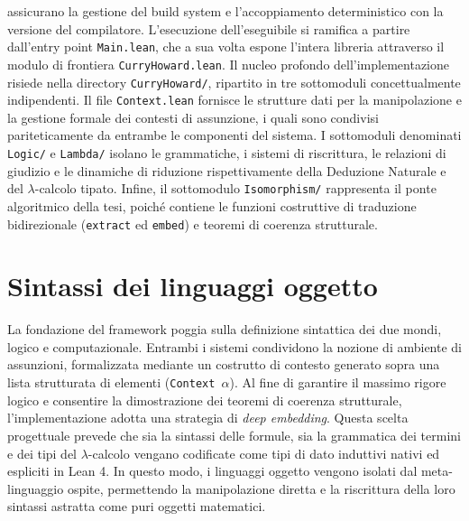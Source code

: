 assicurano la gestione del build system e l'accoppiamento deterministico con la versione del compilatore. L'esecuzione dell'eseguibile si ramifica a partire dall'entry 
point \texttt{Main.lean}, che a sua volta espone l'intera libreria attraverso il modulo di frontiera \texttt{CurryHoward.lean}. Il nucleo profondo dell'implementazione 
risiede nella directory \texttt{CurryHoward/}, ripartito in tre sottomoduli concettualmente indipendenti. Il file \texttt{Context.lean} fornisce le strutture dati per 
la manipolazione e la gestione formale dei contesti di assunzione, i quali sono condivisi pariteticamente da entrambe le componenti del sistema. I sottomoduli denominati 
\texttt{Logic/} e \texttt{Lambda/} isolano le grammatiche, i sistemi di riscrittura, le relazioni di giudizio e le dinamiche di riduzione rispettivamente della Deduzione 
Naturale e del $\lambda$-calcolo tipato. Infine, il sottomodulo \texttt{Isomorphism/} rappresenta il ponte algoritmico della tesi, poiché contiene le funzioni costruttive 
di traduzione bidirezionale (\texttt{extract} ed \texttt{embed}) e teoremi di coerenza strutturale.

\section{Sintassi dei linguaggi oggetto}
La fondazione del framework poggia sulla definizione sintattica dei due mondi, logico e computazionale. Entrambi i sistemi condividono la nozione di ambiente di assunzioni, 
formalizzata mediante un costrutto di contesto generato sopra una lista strutturata di elementi (\texttt{Context $\alpha$}). Al fine di garantire il massimo rigore logico e 
consentire la dimostrazione dei teoremi di coerenza strutturale, l'implementazione adotta una strategia di \emph{deep embedding}. Questa scelta progettuale prevede che sia la 
sintassi delle formule, sia la grammatica dei termini e dei tipi del $\lambda$-calcolo vengano codificate come tipi di dato induttivi nativi ed espliciti in Lean 4. In questo modo, 
i linguaggi oggetto vengono isolati dal meta-linguaggio ospite, permettendo la manipolazione diretta e la riscrittura della loro sintassi astratta come puri oggetti matematici.

